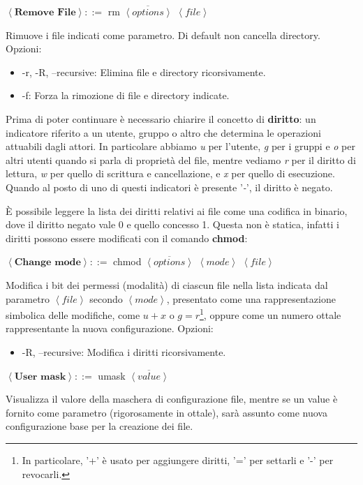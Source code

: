 \noindent$\left<\textbf{Remove File}\right>::=$ rm $\overline{\left<options\right>}$ $\left<file\right>$\par
Rimuove i file indicati come parametro. Di default non cancella directory. Opzioni: \begin{itemize}
	\item -r, -R, --recursive: Elimina file e directory ricorsivamente. 
	\item -f: Forza la rimozione di file e directory indicate.
\end{itemize}

\noindent Prima di poter continuare è necessario chiarire il concetto di \textbf{diritto}: un indicatore riferito a un utente, gruppo o altro che
determina le operazioni attuabili dagli attori. In particolare abbiamo \textit{u} per l'utente, \textit{g} per i gruppi e \textit{o} per altri utenti
quando si parla di proprietà del file, mentre vediamo \textit{r} per il diritto di lettura, \textit{w} per quello di scrittura e cancellazione, e
\textit{x} per quello di esecuzione. Quando al posto di uno di questi indicatori è presente '\textit{-}', il diritto è negato.\par
È possibile leggere la lista dei diritti relativi ai file come una codifica in binario, dove il diritto negato vale 0 e quello concesso 1. Questa non è
statica, infatti i diritti possono essere modificati con il comando \textbf{chmod}:\newline

\noindent \noindent$\left<\textbf{Change mode}\right>::=$ chmod $\overline{\left<options\right>}$ $\left<mode\right>$ $\left<file\right>$\par
Modifica i bit dei permessi (modalità) di ciascun file nella lista indicata dal parametro $\left<file\right>$ secondo $\left<mode\right>$, presentato
come una rappresentazione simbolica delle modifiche, come $u+x$ o $g=r$\footnote{In particolare, '+' è usato per aggiungere diritti, '=' per settarli e
'-' per revocarli.}, oppure come un numero ottale rappresentante la nuova configurazione. Opzioni: \begin{itemize}
	\item -R, --recursive: Modifica i diritti ricorsivamente.
\end{itemize}

\noindent \noindent$\left<\textbf{User mask}\right>::=$ umask $\overline{\left<value\right>}$\par
Visualizza il valore della maschera di configurazione file, mentre se un value è fornito come parametro (rigorosamente in ottale), sarà assunto come
nuova configurazione base per la creazione dei file.\newline


